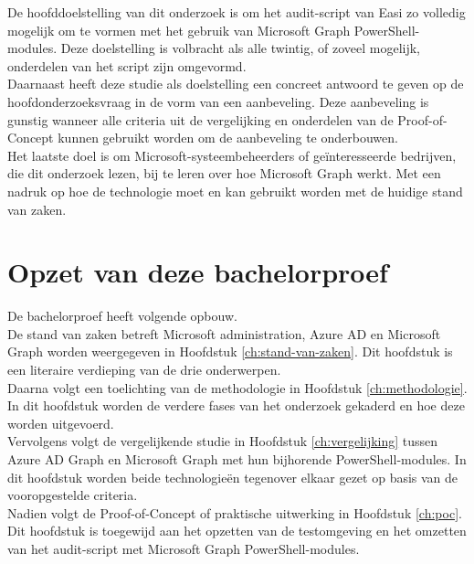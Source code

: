 De hoofddoelstelling van dit onderzoek is om het audit-script van Easi zo volledig mogelijk om te vormen met het gebruik van Microsoft Graph PowerShell-modules. Deze doelstelling is volbracht als alle twintig, of zoveel mogelijk, onderdelen van het script zijn omgevormd. \\

Daarnaast heeft deze studie als doelstelling een concreet antwoord te geven op de hoofdonderzoeksvraag in de vorm van een aanbeveling. Deze aanbeveling is gunstig wanneer alle criteria uit de vergelijking en onderdelen van de Proof-of-Concept kunnen gebruikt worden om de aanbeveling te onderbouwen. \\

Het laatste doel is om Microsoft-systeembeheerders of geïnteresseerde bedrijven, die dit onderzoek lezen, bij te leren over hoe Microsoft Graph werkt. Met een nadruk op hoe de technologie moet en kan gebruikt worden met de huidige stand van zaken. 

\section{Opzet van deze bachelorproef}%
\label{sec:opzet-bachelorproef}

De bachelorproef heeft volgende opbouw. \\

De stand van zaken betreft Microsoft administration, Azure \ac{AD} en Microsoft Graph worden weergegeven in Hoofdstuk \ref{ch:stand-van-zaken}. Dit hoofdstuk is een literaire verdieping van de drie onderwerpen. \\

Daarna volgt een toelichting van de methodologie in Hoofdstuk \ref{ch:methodologie}. In dit hoofdstuk worden de verdere fases van het onderzoek gekaderd en hoe deze worden uitgevoerd. \\

Vervolgens volgt de vergelijkende studie in Hoofdstuk \ref{ch:vergelijking} tussen Azure \Ac{AD} Graph en Microsoft Graph met hun bijhorende PowerShell-modules. In dit hoofdstuk worden beide technologieën tegenover elkaar gezet op basis van de vooropgestelde criteria. \\

Nadien volgt de Proof-of-Concept of praktische uitwerking in Hoofdstuk \ref{ch:poc}. Dit hoofdstuk is toegewijd aan het opzetten van de testomgeving en het omzetten van het audit-script met Microsoft Graph PowerShell-modules. \\

